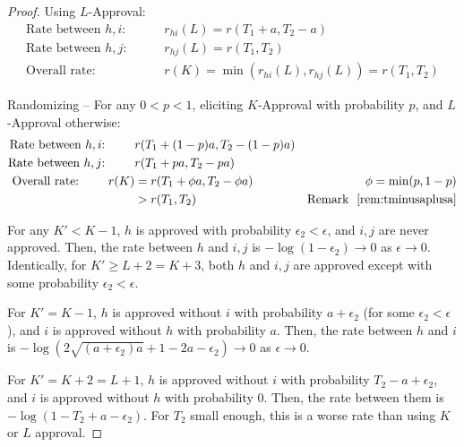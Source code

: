 \documentclass[10pt]{article}
\begin{document}
\begin{ReviewVerbatim}
\begin{proof}
Using $L$-Approval:
\begin{align*}
\text{Rate between $h,i$: }\,\,\,\,\,\,\,\,\,\,\ &r_{hi}(L) = r(T_1+a,T_2-a)\\
\text{Rate between $h,j$: }\,\,\,\,\,\,\,\,\,\,\ &r_{hj}(L) = r(T_1,T_2)\\
\text{Overall rate: }\,\,\,\,\,\,\,\,\,\,\ &r(K) = \min(r_{hi}(L),r_{hj}(L)) = r(T_1,T_2)
\end{align*}

Randomizing -- For any $0<p<1$, eliciting $K$-Approval with probability $p$, and $L$-Approval otherwise:
\begin{align*}
\text{Rate between $h,i$: }\,\,\,\,\,\,\,\,\,\,\ & r(T_1+(1-p)a,T_2-(1-p)a)\\
\text{Rate between $h,j$: }\,\,\,\,\,\,\,\,\,\,\  & r(T_1+pa,T_2-pa)\\
\text{Overall rate: }\,\,\,\,\,\,\,\,\,\,\ r(K) &= r(T_1 + \phi a,T_2 - \phi a) & \phi =\min(p,1-p)\\ %
&>r(T_1,T_2)  & \text{Remark }~\ref{rem:tminusaplusa}
\end{align*}
%
%
%
%

For any $K' < K-1$, $h$ is approved with probability $\epsilon_2 < \epsilon$, and $i,j$ are never approved. Then, the rate between $h$ and $i,j$ is $-\log(1 - \epsilon_2) \to 0$ as $\epsilon\to 0$. Identically, for $K'\geq L+2=K+3$, both $h$ and $i,j$ are approved except with some probability $\epsilon_2 < \epsilon$.

For $K' = K-1$, $h$ is approved without $i$ with probability $a + \epsilon_2$ (for some $\epsilon_2 < \epsilon$), and $i$ is approved without $h$ with probability $a$. Then, the rate between $h$ and $i$ is $-\log(2\sqrt{(a + \epsilon_2)a} + 1 - 2a - \epsilon_2) \to 0$ as $\epsilon\to 0$.

For $K' = K+2 = L+1$, $h$ is approved without $i$ with probability $T_2 - a + \epsilon_2$, and $i$ is approved without $h$ with probability $0$. Then, the rate between them is $-\log(1 - T_2 + a - \epsilon_2)$. For $T_2$ small enough, this is a worse rate than using $K$ or $L$ approval.


\end{proof}
\end{ReviewVerbatim}
\end{document}
